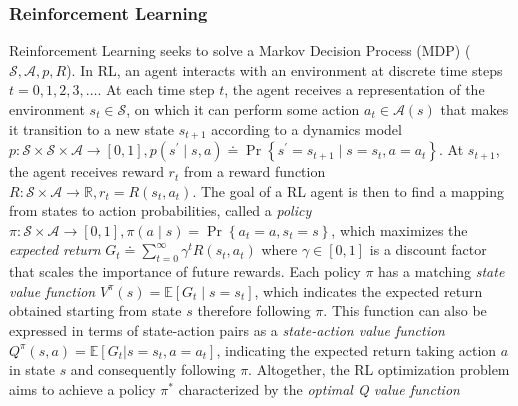 \subsubsection{Reinforcement Learning}\label{sec:RL_BG}
Reinforcement Learning seeks to solve a Markov Decision Process
(MDP) ($\mathcal{S},\mathcal{A},p,R$). In
RL, an agent interacts with an environment at
discrete time steps $t=0,1,2,3,\ldots$. At each time step $t$, the
agent receives a representation of the environment $s_t \in
\mathcal{S}$, on which it can perform some action $a_t \in
\mathcal{A}(s)$ that makes it transition to a new state
$s_{t+1}$ according to a dynamics model
$p\colon\mathcal{S}\times\mathcal{S}\times\mathcal{A}\rightarrow
\left[0,1\right],p\left(s^\prime\mid
  s,a\right)\doteq\Pr\left\{s^\prime=s_{t+1}\mid
  s=s_t,a=a_t\right\}$. At $s_{t+1}$, the agent receives
reward $r_t$ from a reward function
$R\colon\mathcal{S}\times\mathcal{A}\rightarrow\mathbb{R},
r_t=R\left(s_t,a_t\right)$. The goal of a RL agent is then to find
a mapping from states to action probabilities, called a \textit{policy}
$\pi\colon\mathcal{S}\times\mathcal{A}\rightarrow\left[0,1\right],
\pi\left(a\mid s\right)=\Pr\left\{a_t=a,s_t=s\right\}$, which
maximizes the \textit{expected return} $G_t\doteq
\sum_{t=0}^{\infty}\gamma^{t}R\left(s_t,a_t\right)$ where
$\gamma\in\left[0,1\right]$ is a discount factor that scales the
importance of future rewards. Each policy $\pi$ has a matching
\textit{state value function}
$V^{\pi}\left(s\right)=\mathbb{E}\left[G_t\mid s=s_t\right]$, which
indicates the expected return obtained starting from state $s$ therefore
following $\pi$. This function can also be expressed in terms of
state-action pairs as a \textit{state-action value function}
$Q^{\pi}\left(s,a\right)=\mathbb{E}\left[G_t|s=s_t,a=a_t\right]$,
indicating the expected return taking action $a$ in state $s$ and
consequently following $\pi$. Altogether, the RL optimization problem aims
to achieve a policy $\pi^*$ characterized by the \textit{optimal Q
  value function}
